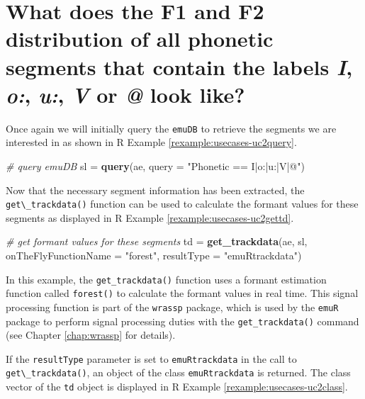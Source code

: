 \documentclass[]{book}
\newenvironment{Shaded}{\begin{snugshade}}{\end{snugshade}}
\newcommand{\CommentTok}[1]{\textcolor[rgb]{0.56,0.35,0.01}{\textit{#1}}}
\newcommand{\DataTypeTok}[1]{\textcolor[rgb]{0.13,0.29,0.53}{#1}}
\newcommand{\KeywordTok}[1]{\textcolor[rgb]{0.13,0.29,0.53}{\textbf{#1}}}
\newcommand{\NormalTok}[1]{#1}
\newcommand{\StringTok}[1]{\textcolor[rgb]{0.31,0.60,0.02}{#1}}
\theoremstyle{definition}
\theoremstyle{definition}
\theoremstyle{definition}
\theoremstyle{remark}
\begin{document}
\hypertarget{sec:app-chap-useCases-q2}{%
\section{\texorpdfstring{What does the F1 and F2 distribution of all
phonetic segments that contain the labels \emph{I}, \emph{o:},
\emph{u:}, \emph{V} or \emph{@} look
like?}{What does the F1 and F2 distribution of all phonetic segments that contain the labels I, o:, u:, V or @ look like?}}\label{sec:app-chap-useCases-q2}}

Once again we will initially query the \texttt{emuDB} to retrieve the
segments we are interested in as shown in R Example
\ref{rexample:usecases-uc2query}.

\begin{Shaded}
\begin{Highlighting}[]
\CommentTok{# query emuDB}
\NormalTok{sl =}\StringTok{ }\KeywordTok{query}\NormalTok{(ae, }\DataTypeTok{query =} \StringTok{"Phonetic == I|o:|u:|V|@"}\NormalTok{)}
\end{Highlighting}
\end{Shaded}

Now that the necessary segment information has been extracted, the
\texttt{get\textbackslash{}\_trackdata()} function can be used to
calculate the formant values for these segments as displayed in R
Example \ref{rexample:usecases-uc2gettd}.

\begin{Shaded}
\begin{Highlighting}[]
\CommentTok{# get formant values for these segments}
\NormalTok{td =}\StringTok{ }\KeywordTok{get_trackdata}\NormalTok{(ae, sl,}
                   \DataTypeTok{onTheFlyFunctionName =} \StringTok{"forest"}\NormalTok{,}
                   \DataTypeTok{resultType =} \StringTok{"emuRtrackdata"}\NormalTok{)}
\end{Highlighting}
\end{Shaded}

In this example, the \texttt{get\_trackdata()} function uses a formant
estimation function called \texttt{forest()} to calculate the formant
values in real time. This signal processing function is part of the
\texttt{wrassp} package, which is used by the \texttt{emuR} package to
perform signal processing duties with the \texttt{get\_trackdata()}
command (see Chapter \ref{chap:wrassp} for details).

If the \texttt{resultType} parameter is set to \texttt{emuRtrackdata} in
the call to \texttt{get\textbackslash{}\_trackdata()}, an object of the
class \texttt{emuRtrackdata} is returned. The class vector of the
\texttt{td} object is displayed in R Example
\ref{rexample:usecases-uc2class}.
\end{document}
